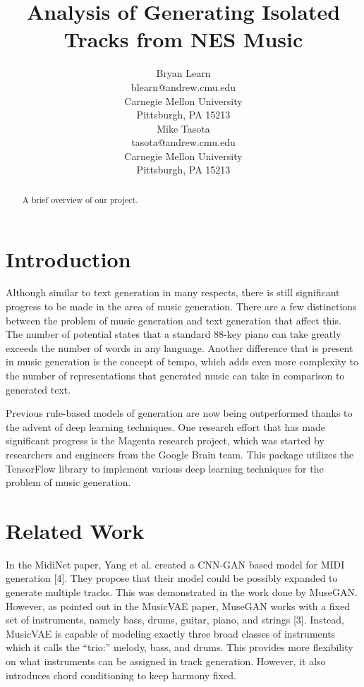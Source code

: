 \documentclass{article}
\title{Analysis of Generating Isolated Tracks from NES Music}
\author{
  Bryan Learn\\
  blearn@andrew.cmu.edu\\
  Carnegie Mellon University\\
  Pittsburgh, PA 15213\\
  \And
  Mike Tasota\\
  tasota@andrew.cmu.edu\\
  Carnegie Mellon University\\
  Pittsburgh, PA 15213\\
}
\begin{document}

\maketitle


\begin{abstract}
  A brief overview of our project.
\end{abstract}


\section{Introduction}


Although similar to text generation in many respects, there is still significant progress to be made in the area of music generation. There are a few distinctions between the problem of music generation and text generation that affect this. The number of potential states that a standard 88-key piano can take greatly exceeds the number of words in any language. Another difference that is present in music generation is the concept of tempo, which adds even more complexity to the number of representations that generated music can take in comparison to generated text.

Previous rule-based models of generation are now being outperformed thanks to the advent of deep learning techniques. One research effort that has made significant progress is the Magenta research project, which was started by researchers and engineers from the Google Brain team. This package utilizes the TensorFlow library to implement various deep learning techniques for the problem of music generation.


\section{Related Work}


In the MidiNet paper, Yang et al. created a CNN-GAN based model for MIDI generation [4]. They propose that their model could be possibly expanded to generate multiple tracks. This was demonstrated in the work done by MuseGAN. However, as pointed out in the MusicVAE paper, MuseGAN works with a fixed set of instruments, namely bass, drums, guitar, piano, and strings [3]. Instead, MusicVAE is capable of modeling exactly three broad classes of instruments which it calls the “trio:” melody, bass, and drums. This provides more flexibility on what instruments can be assigned in track generation. However, it also introduces chord conditioning to keep harmony fixed.
\end{document}
